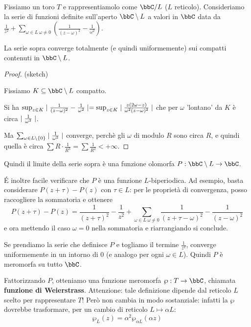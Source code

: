 Fissiamo un toro $T$ e rappresentiamolo come $\bbC/L$ ($L$ reticolo).
Consideriamo la serie di funzioni definite sull'aperto $\bbC\setminus L$ a valori in $\bbC$ data da $\frac{1}{z^2}+\sum_{\omega\in L\ \omega\not=0}(\frac{1}{(z-\omega)^2}-\frac{1}{\omega^2})$.

\begin{proposizione}
La serie sopra converge totalmente (e quindi uniformemente) sui compatti contenuti in $\bbC\setminus L$.
\end{proposizione}
\begin{proof}(sketch)

Fissiamo $K\subseteq\bbC\setminus L$ compatto.

Si ha $\sup_{z\in K}\mid \frac{1}{(z-\omega)^2}-\frac{1}{\omega^2} \mid=\sup_{z\in K}\mid \frac{z(2\omega-z)}{\omega^2(z-\omega)^2} \mid$ che per $\omega$ 'lontano' da $K$ è circa $\mid \frac{1}{\omega^3} \mid$.

Ma $\sum_{\omega\in L\setminus\{0\}}\mid \frac{1}{\omega^3} \mid$ converge, perchè
gli $\omega$ di modulo $R$ sono circa $R$, e quindi quella è circa $\sum R\cdot\frac{1}{R^3}=\sum\frac{1}{R^2}<+\infty$.
\end{proof}

Quindi il limite della serie sopra è una funzione olomorfa $P:\bbC\setminus L\rar\bbC$.

\'E inoltre facile verificare che $P$ è una funzione $L$-biperiodica.
Ad esempio, basta considerare $P(z+\tau)-P(z)$ con $\tau \in L$: per le proprietà di convergenza, posso raccogliere la sommatoria e ottenere
\[ P(z+\tau) - P(z) = \frac1{(z+\tau)^2} - \frac1{z^2} + \sum_{\omega \in L\ \omega\ne 0} \frac1{(z+\tau-\omega)^2}-\frac1{(z-\omega)^2}\]
e ora mettendo il caso $\omega=0$ nella sommatoria e riarrangiando si conclude.

Se prendiamo la serie che definisce $P$ e togliamo il termine $\frac{1}{z^2}$, converge uniformemente in un intorno di $0$ (e analogo per ogni $\omega\in L$).
Quindi $P$ è meromorfa su tutto $\bbC$.

Fattorizzando $P$, otteniamo una funzione meromorfa $\wp:T\rar\bbC$, chiamata \textbf{funzione di Weierstrass}. Attenzione: tale definizione dipende dal reticolo $L$ scelto per rappresentare $T$! Però non cambia in modo sostanziale: infatti la $\wp$ dovrebbe trasformare, per un cambio di reticolo $L \mapsto \alpha L$:
\[
 \wp_L(z) = \alpha^2 \wp_{\alpha L}(\alpha z)
\]

